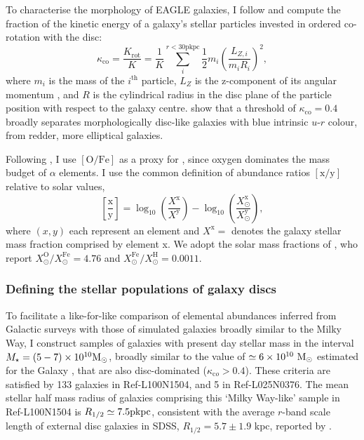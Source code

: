 To characterise the morphology of EAGLE galaxies, I follow \citet{2017arXiv170406283C} and compute the fraction of the kinetic energy of a galaxy's stellar particles invested in ordered co-rotation with the disc:
\begin{equation}
\kappa_{\mathrm{co}} = \frac{K_{\mathrm{rot}}}{K} = \frac{1}{K}\sum^{r < 30\mathrm{pkpc}}_i{\frac{1}{2}m_i\left(\frac{L_{Z,i}}{m_{i}R_{i}}\right)^{2}},
\end{equation}
where $m_i$ is the mass of the $i^{\mathrm{th}}$ particle, $L_Z$ is the z-component of its angular momentum , and $R$ is the cylindrical radius in the disc plane of the particle position with respect to the galaxy centre. \citet{2017arXiv170406283C} show that a threshold of $\kappa_{\mathrm{co}} = 0.4$ broadly separates morphologically disc-like galaxies with blue intrinsic $u$-$r$ colour, from redder, more elliptical galaxies. 

Following \citet{2016MNRAS.461L.102S}, I use $\mathrm{[O/Fe]}$ as a proxy for \afe{}, since oxygen dominates the mass budget of $\alpha$ elements. I use the common definition of abundance ratios $\mathrm{[x/y]}$ relative to solar values,
\begin{equation}
\left[\frac{\mathrm{x}}{\mathrm{y}}\right]  = \log_{10}{\left(\frac{X^{\mathrm{x}}}{X^{\mathrm{y}}}\right)} -  \log_{10}{\left(\frac{X_{\odot}^{\mathrm{x}}}{X_{\odot}^{\mathrm{y}}}\right)},
\end{equation}
where $(x,y)$ each represent an element and $X^{\mathrm{x}} = $ denotes the galaxy stellar mass fraction comprised by element x. We adopt the solar mass fractions of \citet{2009ARA&A..47..481A}, who report $X_{\odot}^{\mathrm{O}}/X_{\odot}^{\mathrm{Fe}} = 4.76$ and $X_{\odot}^{\mathrm{Fe}}/X_{\odot}^{\mathrm{H}} = 0.0011$.


\subsubsection{Defining the stellar populations of galaxy discs}
\label{sec:disc_stellar_pops}

To facilitate a like-for-like comparison of elemental abundances inferred from Galactic surveys with those of simulated galaxies broadly similar to the Milky Way, I construct samples of galaxies with present day stellar mass in the interval $M_\star = (5 - 7) \times 10^{10} {\rm M}_\odot$, broadly similar to the value of $\simeq 6 \times 10^{10}~{\rm M}_\odot$ estimated for the Galaxy \citep[e.g.][]{2011MNRAS.414.2446M,2016ARA&A..54..529B}, that are also disc-dominated ($\kappa_{\mathrm co} > 0.4$). These criteria are satisfied by 133 galaxies in Ref-L100N1504, and 5 in Ref-L025N0376. The mean stellar half mass radius of galaxies comprising this `Milky Way-like' sample in Ref-L100N1504 is $R_{1/2} \simeq 7.5 {\rm pkpc}$, consistent with the average $r$-band scale length of external disc galaxies in SDSS, $R_{1/2} = 5.7 \pm 1.9$ kpc, reported by \citet{2010MNRAS.406.1595F}.

